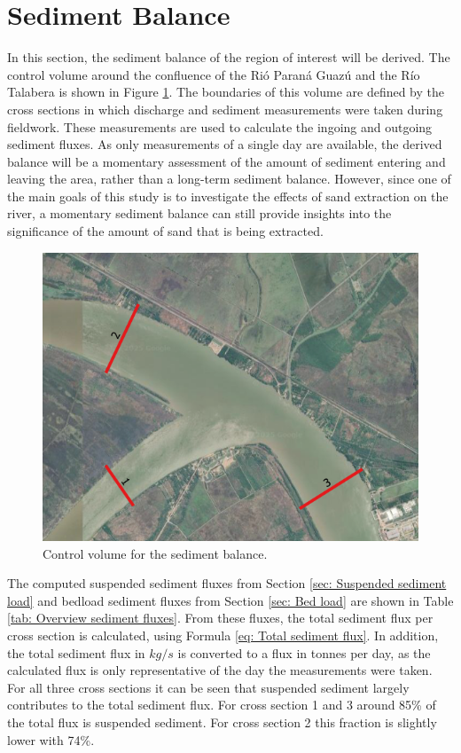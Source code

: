 \section{Sediment Balance}
\label{sec: Sediment Balance}
In this section, the sediment balance of the region of interest will be derived. The control volume around the confluence of the Rió Paraná Guazú and the Río Talabera is shown in Figure \ref{fig:Area sediment balance}. The boundaries of this volume are defined by the cross sections in which discharge and sediment measurements were taken during fieldwork. These measurements are used to calculate the ingoing and outgoing sediment fluxes. As only measurements of a single day are available, the derived balance will be a momentary assessment of the amount of sediment entering and leaving the area, rather than a long-term sediment balance. However, since one of the main goals of this study is to investigate the effects of sand extraction on the river, a momentary sediment balance can still provide insights into the significance of the amount of sand that is being extracted.

\begin{figure}[H]
    \centering
    \includegraphics[width=0.75\linewidth]{figures/ch6/Map_sed_balance.png}
    \caption{Control volume for the sediment balance.}
    \label{fig:Area sediment balance}
\end{figure}

The computed suspended sediment fluxes from Section \ref{sec: Suspended sediment load} and bedload sediment fluxes from Section \ref{sec: Bed load} are shown in Table \ref{tab: Overview sediment fluxes}. From these fluxes, the total sediment flux per cross section is calculated, using Formula \ref{eq: Total sediment flux}. In addition, the total sediment flux in $kg/s$ is converted to a flux in tonnes per day, as the calculated flux is only representative of the day the measurements were taken. For all three cross sections it can be seen that suspended sediment largely contributes to the total sediment flux. For cross section 1 and 3 around 85\% of the total flux is suspended sediment. For cross section 2 this fraction is slightly lower with 74\%. 

